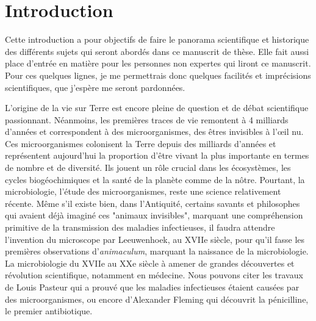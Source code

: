 \chapter*{Introduction}

Cette introduction a pour objectifs de faire le panorama scientifique et historique des différents sujets qui seront abordés dans ce manuscrit de thèse. Elle fait aussi place d'entrée en matière pour les personnes non expertes qui liront ce manuscrit. Pour ces quelques lignes, je me permettrais donc quelques facilités et imprécisions scientifiques, que j'espère me seront pardonnées.
\newline

L'origine de la vie sur Terre est encore pleine de question et de débat scientifique passionnant. Néanmoins, les premières traces de vie remontent à 4 milliards d'années et correspondent à des microorganismes, des êtres invisibles à l'{\oe}il nu. Ces microorganismes colonisent la Terre depuis des milliards d'années et représentent aujourd'hui la proportion d'être vivant la plus importante en termes de nombre et de diversité. Ils jouent un rôle crucial dans les écosystèmes, les cycles biogéochimiques et la santé de la planète comme de la nôtre. Pourtant, la microbiologie, l'étude des microorganismes, reste une science relativement récente. Même s'il existe bien, dans l'Antiquité, certains savants et philosophes qui avaient déjà imaginé ces "animaux invisibles", marquant une compréhension primitive de la transmission des maladies infectieuses, il faudra attendre l'invention du microscope par Leeuwenhoek, au XVIIe siècle, pour qu'il fasse les premières observations d'\textit{animaculum}, marquant la naissance de la microbiologie. La microbiologie du XVIIe au XXe siècle à amener de grandes découvertes et révolution scientifique, notamment en médecine. Nous pouvons citer les travaux de Louis Pasteur qui a prouvé que les maladies infectieuses étaient causées par des microorganismes, ou encore d'Alexander Fleming qui découvrit la pénicilline, le premier antibiotique. 


